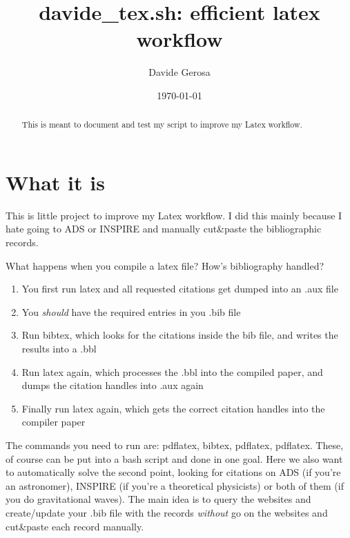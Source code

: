 \documentclass[floats,floatfix,showpacs,amssymb,twocolumn,superscriptaddress,nofootinbib]{revtex4}
\begin{document}
\title{davide\_tex.sh: efficient latex workflow}

\author{Davide Gerosa}

\date{\today}

\begin{abstract}

This is meant to document and test my script to improve my Latex workflow.
\end{abstract}
\maketitle 

\cite{2015EPJC...75..212K}


\section{What it is}

This is little project to improve my Latex workflow. I did this mainly because I hate going to ADS or INSPIRE and manually cut\&paste the bibliographic records.

What happens when you compile a latex file? How's bibliography handled?

\begin{enumerate}
\item You first run latex and all requested citations get dumped into an .aux file
\item You \emph{should} have the required entries in you .bib file
\item Run bibtex, which looks for the citations inside the bib file, and writes the results into a .bbl
\item Run latex again, which processes the .bbl into the compiled paper, and dumps the citation handles into .aux again
\item Finally run latex again, which gets the correct citation handles into the compiler paper
\end{enumerate}

The commands you need to run are: pdflatex, bibtex, pdflatex, pdflatex. These, of course can be put into a bash script and done in one goal.
Here we also want to automatically solve the second point,  looking for citations on ADS (if you're an astronomer), INSPIRE (if you're a theoretical physicists) or both of them (if you do gravitational waves).
The main idea is to query the websites and create/update your .bib file with the records \emph{without} go on the websites and cut\&paste each record manually.
\end{document}
